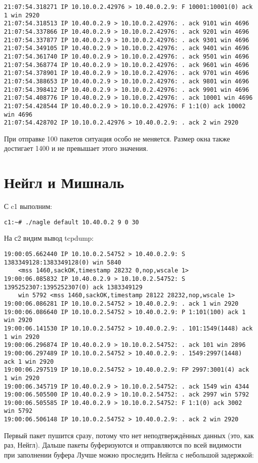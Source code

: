 \documentclass[a4paper,12pt]{article}
\begin{document}
\begin{Verbatim}
21:07:54.318271 IP 10.10.0.2.42976 > 10.40.0.2.9: F 10001:10001(0) ack 1 win 2920 
21:07:54.318513 IP 10.40.0.2.9 > 10.10.0.2.42976: . ack 9101 win 4696 
21:07:54.337866 IP 10.40.0.2.9 > 10.10.0.2.42976: . ack 9201 win 4696 
21:07:54.337877 IP 10.40.0.2.9 > 10.10.0.2.42976: . ack 9301 win 4696 
21:07:54.349105 IP 10.40.0.2.9 > 10.10.0.2.42976: . ack 9401 win 4696 
21:07:54.361740 IP 10.40.0.2.9 > 10.10.0.2.42976: . ack 9501 win 4696 
21:07:54.368774 IP 10.40.0.2.9 > 10.10.0.2.42976: . ack 9601 win 4696 
21:07:54.378901 IP 10.40.0.2.9 > 10.10.0.2.42976: . ack 9701 win 4696 
21:07:54.388653 IP 10.40.0.2.9 > 10.10.0.2.42976: . ack 9801 win 4696 
21:07:54.398412 IP 10.40.0.2.9 > 10.10.0.2.42976: . ack 9901 win 4696 
21:07:54.408776 IP 10.40.0.2.9 > 10.10.0.2.42976: . ack 10001 win 4696 
21:07:54.428544 IP 10.40.0.2.9 > 10.10.0.2.42976: F 1:1(0) ack 10002 win 4696 
21:07:54.428702 IP 10.10.0.2.42976 > 10.40.0.2.9: . ack 2 win 2920 
\end{Verbatim}

При отправке 100 пакетов ситуация особо не меняется. Размер окна также достигает 1400 и не превышает этого значения.

\section{Нейгл и Мишналь}

С c1 выполним:
\begin{Verbatim}
c1:~# ./nagle default 10.40.0.2 9 0 30
\end{Verbatim}

На с2 видим вывод tcpdump:
\begin{Verbatim}
19:00:05.662440 IP 10.10.0.2.54752 > 10.40.0.2.9: S 1383349128:1383349128(0) win 5840 
	<mss 1460,sackOK,timestamp 28232 0,nop,wscale 1>
19:00:06.085832 IP 10.40.0.2.9 > 10.10.0.2.54752: S 1395252307:1395252307(0) ack 1383349129 
	win 5792 <mss 1460,sackOK,timestamp 28122 28232,nop,wscale 1>
19:00:06.086281 IP 10.10.0.2.54752 > 10.40.0.2.9: . ack 1 win 2920 
19:00:06.086640 IP 10.10.0.2.54752 > 10.40.0.2.9: P 1:101(100) ack 1 win 2920 
19:00:06.141530 IP 10.10.0.2.54752 > 10.40.0.2.9: . 101:1549(1448) ack 1 win 2920 
19:00:06.296874 IP 10.40.0.2.9 > 10.10.0.2.54752: . ack 101 win 2896 
19:00:06.297489 IP 10.10.0.2.54752 > 10.40.0.2.9: . 1549:2997(1448) ack 1 win 2920 
19:00:06.297519 IP 10.10.0.2.54752 > 10.40.0.2.9: FP 2997:3001(4) ack 1 win 2920 
19:00:06.345719 IP 10.40.0.2.9 > 10.10.0.2.54752: . ack 1549 win 4344 
19:00:06.505500 IP 10.40.0.2.9 > 10.10.0.2.54752: . ack 2997 win 5792 
19:00:06.505585 IP 10.40.0.2.9 > 10.10.0.2.54752: F 1:1(0) ack 3002 win 5792 
19:00:06.506148 IP 10.10.0.2.54752 > 10.40.0.2.9: . ack 2 win 2920 
\end{Verbatim}
Первый пакет пушится сразу, потому что нет неподтверждённых данных (это, как раз, Нейгл). Дальше пакеты буферизуются и отправляются 
по всей видимости при заполнении буфера
Лучше можно проследить Нейгла с небольшой задержкой:
\end{document}
